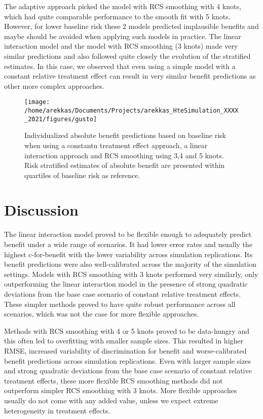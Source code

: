 \documentclass{article}
\begin{document}
The adaptive approach picked the model with RCS smoothing with 4 knots,
which had quite comparable performance to the smooth fit with 5 knots.
However, for lower baseline risk these 2 models predicted implausible
benefits and maybe should be avoided when applying such models in
practice. The linear interaction model and the model with RCS smoothing
(3 knots) made very similar predictions and also followed quite closely
the evolution of the stratified estimates. In this case, we observed
that even using a simple model with a constant relative treatment effect
can result in very similar benefit predictions as other more complex
approaches.

\begin{figure}
\texttt{[image: /home/arekkas/Documents/Projects/arekkas\_HteSimulation\_XXXX\_2021/figures/gusto]} \caption{Individualized absolute benefit predictions based on baseline risk when using a constantn treatment effect approach, a linear interaction approach and RCS smoothing using 3,4 and 5 knots. Risk stratified estimates of absolute benefit are presented within quartiles of baseline risk as reference.}\label{fig:gusto}
\end{figure}

\hypertarget{discussion}{%
\section{Discussion}\label{discussion}}

The linear interaction model proved to be flexible enough to adequately
predict benefit under a wide range of scenarios. It had lower error
rates and usually the highest c-for-benefit with the lower variability
across simulation replications. Its benefit predictions were also
well-calibrated across the majority of the simulation settings. Models
with RCS smoothing with 3 knots performed very similarly, only
outperforming the linear interaction model in the presence of strong
quadratic deviations from the base case scenario of constant relative
treatment effects. These simpler methods proved to have quite robust
performance across all scenarios, which was not the case for more
flexible approaches.

Methods with RCS smoothing with 4 or 5 knots proved to be data-hungry
and this often led to overfitting with smaller sample sizes. This
resulted in higher RMSE, increased variability of discrimination for
benefit and worse-calibrated benefit predictions across simulation
replications. Even with larger sample sizes and strong quadratic
deviations from the base case scenario of constant relative treatment
effects, these more flexible RCS smoothing methods did not outperform
simpler RCS smoothing with 3 knots. More flexible approaches usually do
not come with any added value, unless we expect extreme heterogeneity in
treatment effects.
\end{document}
